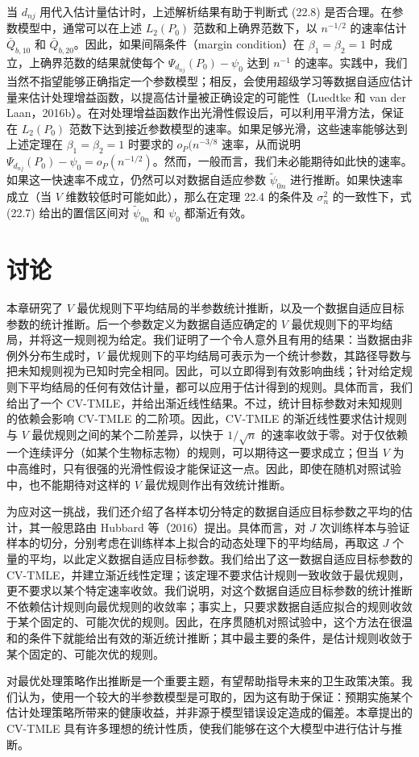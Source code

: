 当 $d_{nj}$ 用代入估计量估计时，上述解析结果有助于判断式 (22.8) 是否合理。在参数模型中，通常可以在上述 $L_2(P_0)$ 范数和上确界范数下，以 $n^{-1/2}$ 的速率估计 $\bar Q_{b,10}$ 和 $\bar Q_{b,20}$。因此，如果间隔条件（margin condition）在 $\beta_1=\beta_2=1$ 时成立，上确界范数的结果就使每个 $\Psi_{d_{nj}}(P_0)-\psi_0$ 达到 $n^{-1}$ 的速率。实践中，我们当然不指望能够正确指定一个参数模型；相反，会使用超级学习等数据自适应估计量来估计处理增益函数，以提高估计量被正确设定的可能性（Luedtke 和 van der Laan，2016b）。在对处理增益函数作出光滑性假设后，可以利用平滑方法，保证在 $L_2(P_0)$ 范数下达到接近参数模型的速率。如果足够光滑，这些速率能够达到上述定理在 $\beta_1=\beta_2=1$ 时要求的 $o_P(n^{-3/8}$ 速率，从而说明 $\Psi_{d_{nj}}(P_0)-\psi_0=o_P(n^{-1/2})$。然而，一般而言，我们未必能期待如此快的速率。如果这一快速率不成立，仍然可以对数据自适应参数 $\tilde\psi_{0n}$ 进行推断。如果快速率成立（当 $V$ 维数较低时可能如此），那么在定理 22.4 的条件及 $\sigma_n^2$ 的一致性下，式 (22.7) 给出的置信区间对 $\tilde\psi_{0n}$ 和 $\psi_0$ 都渐近有效。

\section{讨论}

本章研究了 $V$ 最优规则下平均结局的半参数统计推断，以及一个数据自适应目标参数的统计推断。后一个参数定义为数据自适应确定的 $V$ 最优规则下的平均结局，并将这一规则视为给定。我们证明了一个令人意外且有用的结果：当数据由非例外分布生成时，$V$ 最优规则下的平均结局可表示为一个统计参数，其路径导数与把未知规则视为已知时完全相同。因此，可以立即得到有效影响曲线；针对给定规则下平均结局的任何有效估计量，都可以应用于估计得到的规则。具体而言，我们给出了一个 CV-TMLE，并给出渐近线性结果。不过，统计目标参数对未知规则的依赖会影响 CV-TMLE 的二阶项。因此，CV-TMLE 的渐近线性要求估计规则与 $V$ 最优规则之间的某个二阶差异，以快于 $1/\sqrt n$ 的速率收敛于零。对于仅依赖一个连续评分（如某个生物标志物）的规则，可以期待这一要求成立；但当 $V$ 为中高维时，只有很强的光滑性假设才能保证这一点。因此，即使在随机对照试验中，也不能期待对这样的 $V$ 最优规则作出有效统计推断。

为应对这一挑战，我们还介绍了各样本切分特定的数据自适应目标参数之平均的估计，其一般思路由 Hubbard 等（2016）提出。具体而言，对 $J$ 次训练样本与验证样本的切分，分别考虑在训练样本上拟合的动态处理下的平均结局，再取这 $J$ 个量的平均，以此定义数据自适应目标参数。我们给出了这一数据自适应目标参数的 CV-TMLE，并建立渐近线性定理；该定理不要求估计规则一致收敛于最优规则，更不要求以某个特定速率收敛。我们说明，对这个数据自适应目标参数的统计推断不依赖估计规则向最优规则的收敛率；事实上，只要求数据自适应拟合的规则收敛于某个固定的、可能次优的规则。因此，在序贯随机对照试验中，这个方法在很温和的条件下就能给出有效的渐近统计推断；其中最主要的条件，是估计规则收敛于某个固定的、可能次优的规则。

对最优处理策略作出推断是一个重要主题，有望帮助指导未来的卫生政策决策。我们认为，使用一个较大的半参数模型是可取的，因为这有助于保证：预期实施某个估计处理策略所带来的健康收益，并非源于模型错误设定造成的偏差。本章提出的 CV-TMLE 具有许多理想的统计性质，使我们能够在这个大模型中进行估计与推断。
